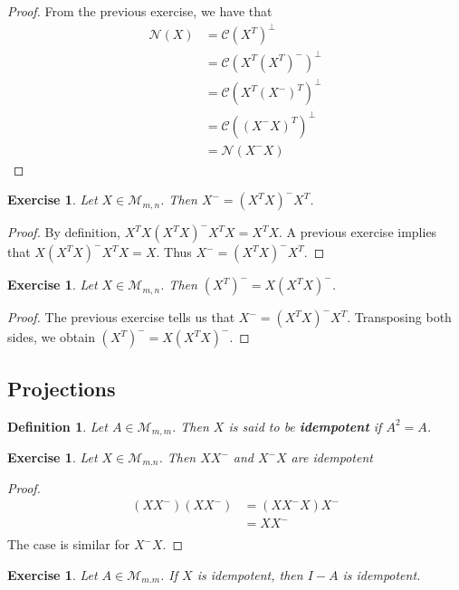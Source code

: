 \documentclass[12pt]{amsart}
\newtheorem{defn}[thm]{Definition}
\newtheorem{ex}[thm]{Exercise}
\newcommand{\MC}{\mathcal{C}}
\newcommand{\MN}{\mathcal{N}}
\newcommand{\MM}{\mathcal{M}}
\newcommand{\z}[1]{Let ${#1} \in \MM_{m,n}$}
\begin{document}
\begin{proof}
From the previous exercise, we have that 
\begin{align*}
\MN(X) 
&= \MC(X^T)^{\perp} \\
&= \MC(X^T(X^T)^-)^{\perp} \\
&= \MC(X^T(X^-)^T)^{\perp} \\
&= \MC((X^-X)^T)^{\perp} \\
&= \MN(X^-X)
\end{align*}
\end{proof}
\vspace{2mm}

\begin{ex}
\z{X}. Then $X^- = (X^TX)^-X^T$. 
\end{ex}

\begin{proof}
By definition, $X^TX (X^TX)^- X^TX = X^TX$. A previous exercise implies that $X(X^TX)^-X^TX = X$. Thus $X^- = (X^TX)^-X^T$.
\end{proof}

\begin{ex}
\z{X}. Then $(X^T)^- = X(X^TX)^-$. 
\end{ex}

\begin{proof}
The previous exercise tells us that $X^- = (X^TX)^-X^T$. Transposing both sides, we obtain $(X^T)^- = X(X^TX)^-$.
\end{proof}

\subsection{Projections}

\begin{defn}
Let $A \in \MM_{m,m}$. Then $X$ is said to be \textbf{idempotent} if $A^2 = A$.
\end{defn}

\begin{ex}
Let $X \in \MM_{m.n}$. Then $XX^-$ and $X^-X$ are idempotent
\end{ex}

\begin{proof}
\begin{align*}
(XX^-)(XX^-) 
&= (XX^-X)X^- \\
&= XX^-\\
\end{align*} The case is similar for $X^-X$.
\end{proof}

\begin{ex}
Let $A \in \MM_{m.m}$. If $X$ is idempotent, then $I-A$ is idempotent.
\end{ex}
\end{document}
